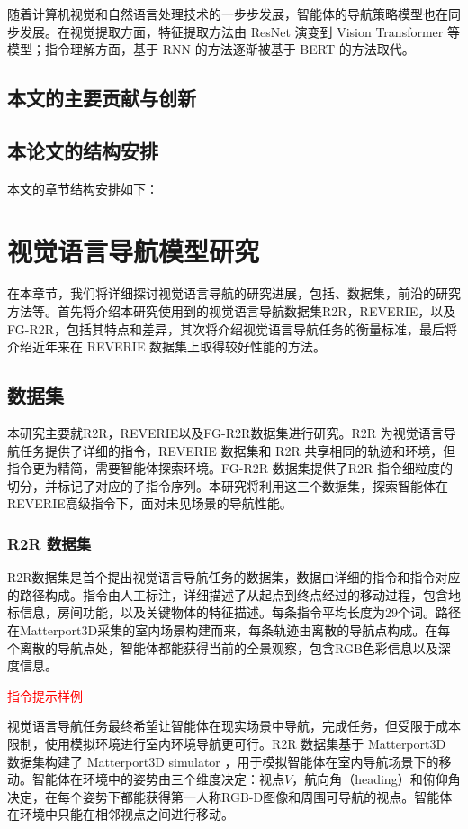 \documentclass[bachelor]{thesis-uestc}
\begin{document}
随着计算机视觉和自然语言处理技术的一步步发展，智能体的导航策略模型也在同步发展。在视觉提取方面，特征提取方法由 ResNet 演变到 Vision Transformer 等模型；指令理解方面，基于 RNN 的方法逐渐被基于 BERT 的方法取代。




\section{本文的主要贡献与创新}

\section{本论文的结构安排}
本文的章节结构安排如下：


\chapter{视觉语言导航模型研究}

在本章节，我们将详细探讨视觉语言导航的研究进展，包括、数据集，前沿的研究方法等。首先将介绍本研究使用到的视觉语言导航数据集R2R，REVERIE，以及FG-R2R，包括其特点和差异，其次将介绍视觉语言导航任务的衡量标准，最后将介绍近年来在 REVERIE 数据集上取得较好性能的方法。

\section{数据集}

本研究主要就R2R，REVERIE以及FG-R2R数据集进行研究。R2R 为视觉语言导航任务提供了详细的指令，REVERIE 数据集和 R2R 共享相同的轨迹和环境，但指令更为精简，需要智能体探索环境。FG-R2R 数据集提供了R2R 指令细粒度的切分，并标记了对应的子指令序列。本研究将利用这三个数据集，探索智能体在REVERIE高级指令下，面对未见场景的导航性能。

\subsection{R2R 数据集}
R2R数据集是首个提出视觉语言导航任务的数据集，数据由详细的指令和指令对应的路径构成。指令由人工标注，详细描述了从起点到终点经过的移动过程，包含地标信息，房间功能，以及关键物体的特征描述。每条指令平均长度为29个词。路径在Matterport3D采集的室内场景构建而来，每条轨迹由离散的导航点构成。在每个离散的导航点处，智能体都能获得当前的全景观察，包含RGB色彩信息以及深度信息。

\textcolor{red}{指令提示样例}

视觉语言导航任务最终希望让智能体在现实场景中导航，完成任务，但受限于成本限制，使用模拟环境进行室内环境导航更可行。R2R 数据集基于 Matterport3D 数据集构建了 Matterport3D simulator ，用于模拟智能体在室内导航场景下的移动。智能体在环境中的姿势由三个维度决定：视点$V$，航向角（heading）和俯仰角决定，在每个姿势下都能获得第一人称RGB-D图像和周围可导航的视点。智能体在环境中只能在相邻视点之间进行移动。
\end{document}

